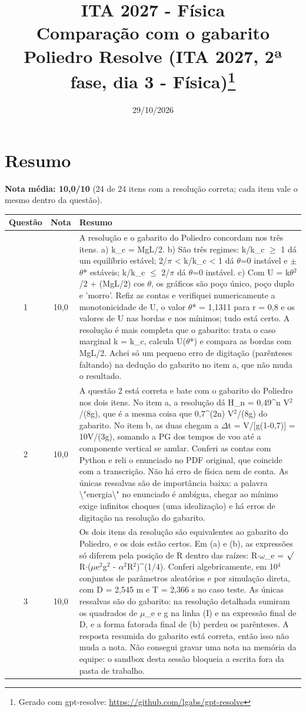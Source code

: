 \documentclass{article}%
\title{ITA 2027 {-} Física\\[4pt]\large Comparação com o gabarito Poliedro Resolve (ITA 2027, 2ª fase, dia 3 {-} Física)\thanks{Gerado com gpt-resolve: \url{https://github.com/lgabs/gpt-resolve}}}%
\date{29/10/2026}%
\begin{document}
%
\normalsize%
\maketitle%
\section*{Resumo}\textbf{Nota média: 10,0/10} (24 de 24 itens com a resolução correta; cada item vale o mesmo dentro da questão).\par\medskip%
\begin{longtable}{@{}c c p{}@{}}\toprule Questão & Nota & Resumo \\ \midrule
1 & 10,0 & A resolução e o gabarito do Poliedro concordam nos três itens. a) k\_c = MgL/2. b) São três regimes: k/k\_c $\geq$ 1 dá um equilíbrio estável; 2/$\pi$ < k/k\_c < 1 dá $\theta$=0 instável e $\pm$$\theta$* estáveis; k/k\_c $\leq$ 2/$\pi$ dá $\theta$=0 instável. c) Com U = k$\theta$$^2$/2 + (MgL/2) cos $\theta$, os gráficos são poço único, poço duplo e 'morro'. Refiz as contas e verifiquei numericamente a monotonicidade de U, o valor $\theta$* = 1,1311 para r = 0,8 e os valores de U nas bordas e nos mínimos; tudo está certo. A resolução é mais completa que o gabarito: trata o caso marginal k = k\_c, calcula U($\theta$*) e compara as bordas com MgL/2. Achei só um pequeno erro de digitação (parênteses faltando) na dedução do gabarito no item a, que não muda o resultado. \\
2 & 10,0 & A questão 2 está correta e bate com o gabarito do Poliedro nos dois itens. No item a, a resolução dá H\_n = 0,49\^{}n V$^2$/(8g), que é a mesma coisa que 0,7\^{}(2n) V$^2$/(8g) do gabarito. No item b, as duas chegam a $\Delta$t = V/{[}g(1-0,7){]} = 10V/(3g), somando a PG dos tempos de voo até a componente vertical se anular. Conferi as contas com Python e reli o enunciado no PDF original, que coincide com a transcrição. Não há erro de física nem de conta. As únicas ressalvas são de importância baixa: a palavra \textbackslash{}"energia\textbackslash{}" no enunciado é ambígua, chegar ao mínimo exige infinitos choques (uma idealização) e há erros de digitação na resolução do gabarito. \\
3 & 10,0 & Os dois itens da resolução são equivalentes ao gabarito do Poliedro, e os dois estão certos. Em (a) e (b), as expressões só diferem pela posição de R dentro das raízes: R$\cdot$$\omega$\_e = $\surd$R$\cdot$($\mu$e$^2$g$^2$ - $\alpha$$^2$R$^2$)\^{}(1/4). Conferi algebricamente, em 10$^{4}$ conjuntos de parâmetros aleatórios e por simulação direta, com D = 2,545 m e T = 2,366 s no caso teste. As únicas ressalvas são do gabarito: na resolução detalhada sumiram os quadrados de $\mu$\_e e g na linha (I) e na expressão final de D, e a forma fatorada final de (b) perdeu os parênteses. A resposta resumida do gabarito está correta, então isso não muda a nota. Não consegui gravar uma nota na memória da equipe: o sandbox desta sessão bloqueia a escrita fora da pasta de trabalho. \\

\end{longtable}
\end{document}
